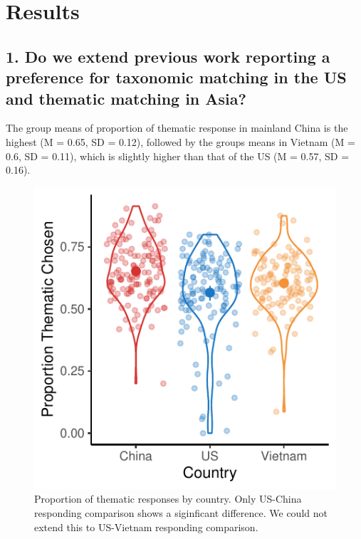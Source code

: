 \documentclass[10pt, letterpaper]{article}
\newenvironment{CodeChunk}{}{}
\begin{document}
\hypertarget{results}{%
\section{Results}\label{results}}

\hypertarget{do-we-extend-previous-work-reporting-a-preference-for-taxonomic-matching-in-the-us-and-thematic-matching-in-asia}{%
\subsection{1. Do we extend previous work reporting a preference for
taxonomic matching in the US and thematic matching in
Asia?}\label{do-we-extend-previous-work-reporting-a-preference-for-taxonomic-matching-in-the-us-and-thematic-matching-in-asia}}

The group means of proportion of thematic response in mainland China is
the highest (M = 0.65, SD = 0.12), followed by the groups means in
Vietnam (M = 0.6, SD = 0.11), which is slightly higher than that of the
US (M = 0.57, SD = 0.16).

\begin{CodeChunk}
\begin{figure}[tb]
\includegraphics{figs/unnamed-chunk-2-1} \caption[Proportion of thematic responses by country]{Proportion of thematic responses by country. Only US-China responding comparison shows a siginficant difference. We could not extend this to US-Vietnam responding comparison.}\label{fig:unnamed-chunk-2}
\end{figure}
\end{CodeChunk}
\end{document}
